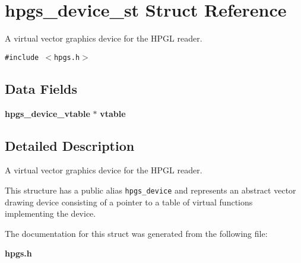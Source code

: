 \section{hpgs\_\-device\_\-st Struct Reference}
\label{structhpgs__device__st}
A virtual vector graphics device for the HPGL reader.  


{\tt \#include $<$hpgs.h$>$}

\subsection*{Data Fields}
\begin{CompactItemize}
\item 
{\bf hpgs\_\-device\_\-vtable} $\ast$ \textbf{vtable}\label{structhpgs__device__st_19dc27125b1aa2d1d6e8bd3325986ba2}

\end{CompactItemize}


\subsection{Detailed Description}
A virtual vector graphics device for the HPGL reader. 

This structure has a public alias {\tt hpgs\_\-device} and represents an abstract vector drawing device consisting of a pointer to a table of virtual functions implementing the device. 

The documentation for this struct was generated from the following file:\begin{CompactItemize}
\item 
{\bf hpgs.h}\end{CompactItemize}
